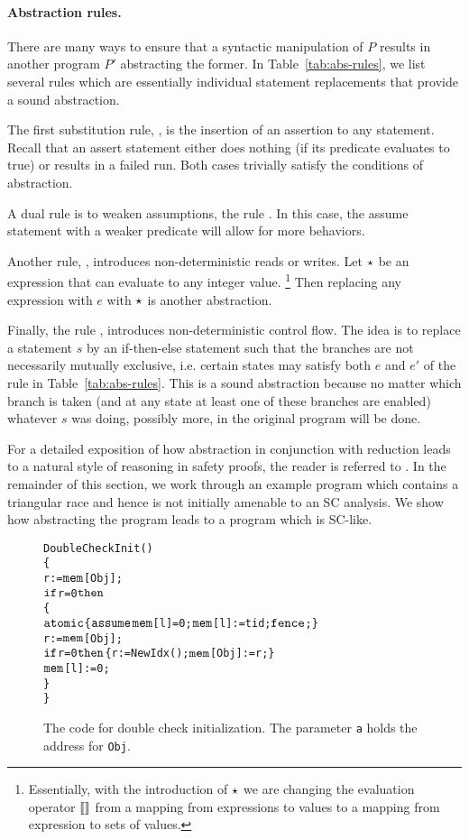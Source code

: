 \documentclass[preprint,9pt]{sigplanconf}
\begin{document}
\paragraph{Abstraction rules.}
There are many ways to ensure that a syntactic manipulation of $P$ results in another program $P'$ abstracting the former.
In Table~\ref{tab:abs-rules}, we list several rules which are essentially individual statement replacements that provide a sound abstraction.

The first substitution rule, {}, is the insertion of an assertion to any statement. 
Recall that an assert statement either does nothing (if its predicate evaluates to true) or results in a failed run.
Both cases trivially satisfy the conditions of abstraction.

A dual rule is to weaken assumptions, the rule {}.
In this case, the assume statement with a weaker predicate will allow for more behaviors.

Another rule, {}, introduces non-deterministic reads or writes.
Let $\star$ be an expression that can evaluate to any integer value.
\footnote{Essentially, with the introduction of $\star$ we are changing the evaluation operator $\llbracket \rrbracket$ from a mapping from expressions to values to a mapping from expression to sets of values.}
Then replacing any expression with $e$ with $\star$ is another abstraction.

Finally, the rule {}, introduces non-deterministic control flow.
The idea is to replace a statement $s$ by an if-then-else statement such that the branches are not necessarily mutually exclusive, i.e. certain states may satisfy both $e$ and $e'$ of the rule in Table~\ref{tab:abs-rules}.
This is a sound abstraction because no matter which branch is taken (and at any state at least one of these branches are enabled) whatever $s$ was doing, possibly more, in the original program will be done.  

For a detailed exposition of how abstraction in conjunction with reduction leads to a natural style of reasoning in safety proofs, the reader is referred to \cite{EQT2009}.
In the remainder of this section, we work through an example program which contains a triangular race and hence is not initially amenable to an SC analysis.
We show how abstracting the program leads to a program which is SC-like.

\begin{figure}[ht]
\begin{alltt}DoubleCheckInit() 
\{
 r:=\(\alimem\)[Obj];
 \(\aliif\) r=0 \(\alithen\) 
 \{
  \(\aliatomic\) \{ \(\aliassume\) {\(\alimem\)[l]=0}; \(\alimem\)[l]:=tid; \(\alifence\); \}
  r:=\(\alimem\)[Obj];
  \(\aliif\) r=0 \(\alithen\) \{ r:=NewIdx(); \(\alimem\)[Obj]:=r; \}
  \(\alimem\)[l]:=0;
 \}
\}\end{alltt}
\caption{The code for double check initialization. The parameter {\tt a} holds the address for {\tt Obj}.}
\label{fig:double-check}
\end{figure}
\end{document}
